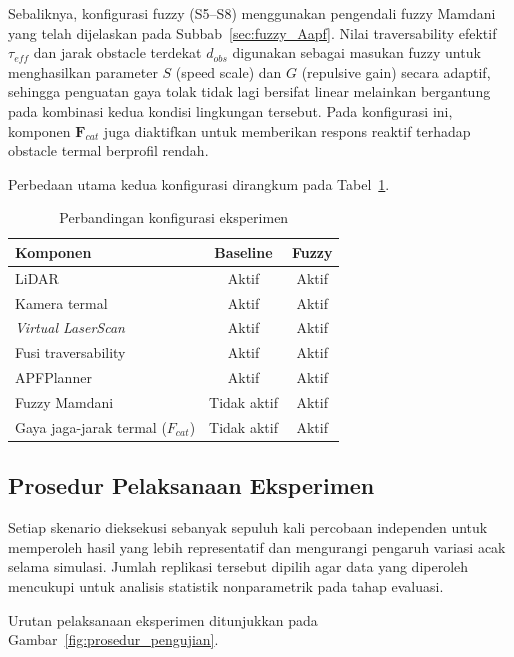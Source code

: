 Sebaliknya, konfigurasi fuzzy (S5--S8) menggunakan pengendali fuzzy Mamdani yang telah dijelaskan pada Subbab~\ref{sec:fuzzy_Aapf}. Nilai traversability efektif $\tau_{eff}$ dan jarak obstacle terdekat $d_{obs}$ digunakan sebagai masukan fuzzy untuk menghasilkan parameter $S$ (speed scale) dan $G$ (repulsive gain) secara adaptif, sehingga penguatan gaya tolak tidak lagi bersifat linear melainkan bergantung pada kombinasi kedua kondisi lingkungan tersebut. Pada konfigurasi ini, komponen $\mathbf{F}_{cat}$ juga diaktifkan untuk memberikan respons reaktif terhadap obstacle termal berprofil rendah.

Perbedaan utama kedua konfigurasi dirangkum pada Tabel~\ref{tab:konfigurasi}.

\begin{table}[h]
    \centering
    \caption{Perbandingan konfigurasi eksperimen}
    \label{tab:konfigurasi}
    \begin{tabular}{lcc}
        \hline
        Komponen & Baseline & Fuzzy \\
        \hline
        LiDAR                          & Aktif       & Aktif \\
        Kamera termal                  & Aktif       & Aktif \\
        \textit{Virtual LaserScan}     & Aktif       & Aktif \\
        Fusi traversability            & Aktif       & Aktif \\
        APFPlanner                     & Aktif       & Aktif \\
        Fuzzy Mamdani                  & Tidak aktif & Aktif \\
        Gaya jaga-jarak termal ($F_{cat}$) & Tidak aktif & Aktif \\
        \hline
    \end{tabular}
\end{table}

\subsection{Prosedur Pelaksanaan Eksperimen}

Setiap skenario dieksekusi sebanyak sepuluh kali percobaan independen untuk memperoleh hasil yang lebih representatif dan mengurangi pengaruh variasi acak selama simulasi. Jumlah replikasi tersebut dipilih agar data yang diperoleh mencukupi untuk analisis statistik nonparametrik pada tahap evaluasi.

Urutan pelaksanaan eksperimen ditunjukkan pada Gambar~\ref{fig:prosedur_pengujian}.

